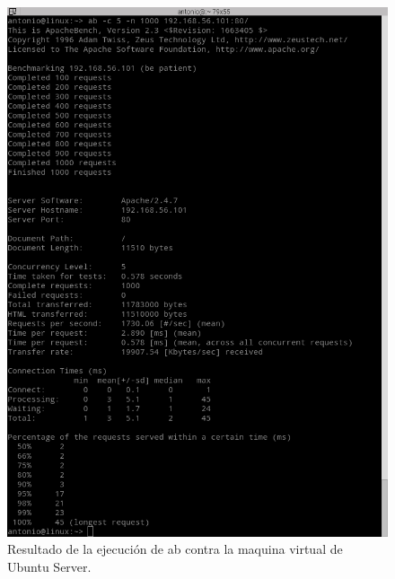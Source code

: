 \begin{figure}[H]
  \begin{center}
    \includegraphics[width=1\textwidth]{imagenes/abub}
    \caption{Resultado de la ejecución de ab contra la maquina virtual de Ubuntu Server.}
    \label{fig3}
  \end{center}
\end{figure}
